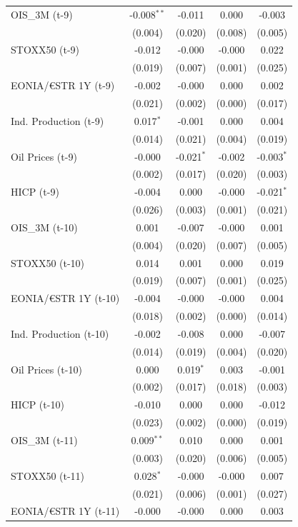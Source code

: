 \begin{longtable}[t]{lcccc}
OIS\_3M (t-9) & -0.008$^{**}$ & -0.011 & 0.000 & -0.003\\
 & (0.004) & (0.020) & (0.008) & (0.005)\\
STOXX50 (t-9) & -0.012 & -0.000 & -0.000 & 0.022\\
 & (0.019) & (0.007) & (0.001) & \vphantom{1} (0.025)\\
EONIA/€STR 1Y (t-9) & -0.002 & -0.000 & 0.000 & 0.002\\
 & (0.021) & (0.002) & (0.000) & \vphantom{1} (0.017)\\
Ind. Production (t-9) & 0.017$^{*}$ & -0.001 & 0.000 & 0.004\\
 & (0.014) & (0.021) & (0.004) & (0.019)\\
Oil Prices (t-9) & -0.000 & -0.021$^{*}$ & -0.002 & -0.003$^{*}$\\
 & (0.002) & (0.017) & (0.020) & (0.003)\\
HICP (t-9) & -0.004 & 0.000 & -0.000 & -0.021$^{*}$\\
 & (0.026) & (0.003) & (0.001) & (0.021)\\
OIS\_3M (t-10) & 0.001 & -0.007 & -0.000 & 0.001\\
 & (0.004) & (0.020) & (0.007) & (0.005)\\
STOXX50 (t-10) & 0.014 & 0.001 & 0.000 & 0.019\\
 & (0.019) & (0.007) & (0.001) & (0.025)\\
EONIA/€STR 1Y (t-10) & -0.004 & -0.000 & -0.000 & 0.004\\
 & (0.018) & (0.002) & (0.000) & (0.014)\\
Ind. Production (t-10) & -0.002 & -0.008 & 0.000 & -0.007\\
 & (0.014) & (0.019) & (0.004) & (0.020)\\
Oil Prices (t-10) & 0.000 & 0.019$^{*}$ & 0.003 & -0.001\\
 & (0.002) & (0.017) & (0.018) & (0.003)\\
HICP (t-10) & -0.010 & 0.000 & 0.000 & -0.012\\
 & (0.023) & (0.002) & (0.000) & (0.019)\\
OIS\_3M (t-11) & 0.009$^{**}$ & 0.010 & 0.000 & 0.001\\
 & (0.003) & (0.020) & (0.006) & (0.005)\\
STOXX50 (t-11) & 0.028$^{*}$ & -0.000 & -0.000 & 0.007\\
 & (0.021) & (0.006) & (0.001) & (0.027)\\
EONIA/€STR 1Y (t-11) & -0.000 & -0.000 & 0.000 & 0.003\\

\end{longtable}

